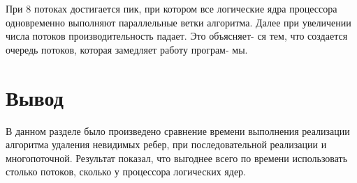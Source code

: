 \newpage

При 8 потоках достигается пик, при котором все логические ядра
процессора одновременно выполняют параллельные ветки алгоритма. Далее
при увеличении числа потоков производительность падает. Это объясняет-
ся тем, что создается очередь потоков, которая замедляет работу програм-
мы.

\section*{Вывод}

В данном разделе было произведено сравнение времени выполнения
реализации алгоритма удаления невидимых ребер, при последовательной реализации и многопоточной. Результат показал, что выгоднее всего по времени использовать столько потоков, сколько у процессора логических ядер.

